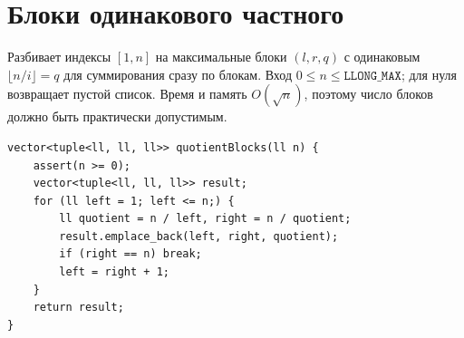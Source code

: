 %

\section{Блоки одинакового частного}
Разбивает индексы $[1,n]$ на максимальные блоки $(l,r,q)$ с одинаковым $\lfloor n/i\rfloor=q$ для суммирования сразу по блокам.
Вход $0\le n\le\texttt{LLONG\_MAX}$; для нуля возвращает пустой список.
Время и память $O(\sqrt n)$, поэтому число блоков должно быть практически допустимым.
\begin{lstlisting}[name=extra_math_quotients]
vector<tuple<ll, ll, ll>> quotientBlocks(ll n) {
    assert(n >= 0);
    vector<tuple<ll, ll, ll>> result;
    for (ll left = 1; left <= n;) {
        ll quotient = n / left, right = n / quotient;
        result.emplace_back(left, right, quotient);
        if (right == n) break;
        left = right + 1;
    }
    return result;
}
\end{lstlisting}
%


